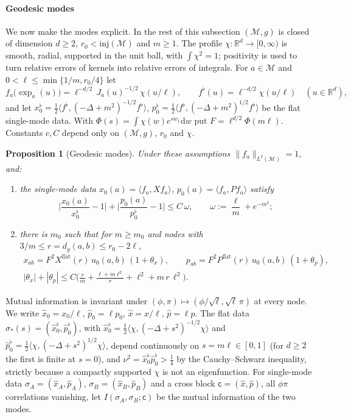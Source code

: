 \documentclass[11pt,a4paper]{article}
\theoremstyle{stmt}
\newtheorem{proposition}[theorem]{Proposition}
\theoremstyle{defn}
\theoremstyle{rmk}
\numberwithin{equation}{section}
\newcommand{\M}{\mathcal{M}}
\newcommand{\R}{\mathbb{R}}
\newcommand{\dd}{\mathrm{d}}
\begin{document}
\paragraph{Geodesic modes} We now make the modes explicit. In the rest of this subsection $(\M,g)$ is closed of dimension $d\ge2$, $r_0<\mathrm{inj}(\M)$ and $m\ge1$. The profile $\chi:\R^d\to[0,\infty)$ is smooth, radial, supported in the unit ball, with $\int\chi^2=1$; positivity is used to turn relative errors of kernels into relative errors of integrals. For $a\in\M$ and $0<\ell\le\min\{1/m,r_0/4\}$ let
\begin{equation}\label{eq:geomode}
f_a\big(\exp_a(u)\big)=\ell^{-d/2}\,J_a(u)^{-1/2}\,\chi(u/\ell),\qquad f^\flat(u)=\ell^{-d/2}\chi(u/\ell)\quad(u\in\R^d),
\end{equation}
and let $x_0^\flat=\tfrac12\langle f^\flat,(-\Delta+m^2)^{-1/2}f^\flat\rangle$, $p_0^\flat=\tfrac12\langle f^\flat,(-\Delta+m^2)^{1/2}f^\flat\rangle$ be the flat single-mode data. With $\Phi(s)=\int\chi(w)e^{sw_1}\dd w$ put $F=\ell^{d/2}\Phi(m\ell)$. Constants $c,C$ depend only on $(\M,g)$, $r_0$ and $\chi$.

\begin{proposition}[Geodesic modes]\label{prop:modes}
Under these assumptions $\|f_a\|_{L^2(\M)}=1$, and:
\begin{enumerate}[label=\textup{(\roman*)}]
\item the single-mode data $x_0(a)=\langle f_a,Xf_a\rangle$, $p_0(a)=\langle f_a,Pf_a\rangle$ satisfy
\[
\Big|\frac{x_0(a)}{x_0^\flat}-1\Big|+\Big|\frac{p_0(a)}{p_0^\flat}-1\Big|\le C\,\omega,\qquad\omega:=\frac\ell m+e^{-m^2};
\]
\item there is $m_0$ such that for $m\ge m_0$ and nodes with $3/m\le r=d_g(a,b)\le r_0-2\ell$,
\begin{gather*}
x_{ab}=F^2X^{\mathrm{flat}}(r)\,u_0(a,b)\,(1+\theta_x),\qquad p_{ab}=F^2P^{\mathrm{flat}}(r)\,u_0(a,b)\,(1+\theta_p),\\
|\theta_x|+|\theta_p|\le C\Big(\frac rm+\frac{\ell+m\ell^2}{r}+\ell^2+m\,r\,\ell^2\Big).
\end{gather*}
\end{enumerate}
\end{proposition}

Mutual information is invariant under $(\phi,\pi)\mapsto(\phi/\sqrt\ell,\sqrt\ell\,\pi)$ at every node. We write $\hat x_0=x_0/\ell$, $\hat p_0=\ell p_0$, $\hat x=x/\ell$, $\hat p=\ell p$. The flat data $\sigma_*(s)=(\hat x_0^\flat,\hat p_0^\flat)$, with $\hat x_0^\flat=\tfrac12\langle\chi,(-\Delta+s^2)^{-1/2}\chi\rangle$ and $\hat p_0^\flat=\tfrac12\langle\chi,(-\Delta+s^2)^{1/2}\chi\rangle$, depend continuously on $s=m\ell\in[0,1]$ (for $d\ge2$ the first is finite at $s=0$), and $\nu^2=\hat x_0^\flat\hat p_0^\flat>\tfrac14$ by the Cauchy--Schwarz inequality, strictly because a compactly supported $\chi$ is not an eigenfunction. For single-mode data $\sigma_A=(\hat x_A,\hat p_A)$, $\sigma_B=(\hat x_B,\hat p_B)$ and a cross block $\mathsf c=(\hat x,\hat p)$, all $\phi\pi$ correlations vanishing, let $I(\sigma_A,\sigma_B;\mathsf c)$ be the mutual information of the two modes.
\end{document}

